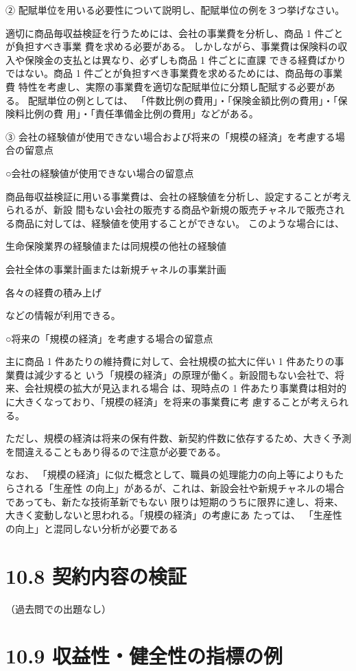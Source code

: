 \documentclass[report,gutter=10mm,fore-edge=10mm,uplatex,dvipdfmx]{jlreq}
\begin{document}
② 配賦単位を用いる必要性について説明し、配賦単位の例を３つ挙げなさい。

適切に商品毎収益検証を行うためには、会社の事業費を分析し、商品 1 件ごとが負担すべき事業
費を求める必要がある。
しかしながら、事業費は保険料の収入や保険金の支払とは異なり、必ずしも商品 1 件ごとに直課
できる経費ばかりではない。商品 1 件ごとが負担すべき事業費を求めるためには、商品毎の事業費
特性を考慮し、実際の事業費を適切な配賦単位に分類し配賦する必要がある。
配賦単位の例としては、
「件数比例の費用」・「保険金額比例の費用」・「保険料比例の費
用」・「責任準備金比例の費用」などがある。

③ 会社の経験値が使用できない場合および将来の「規模の経済」を考慮する場合の留意点

○会社の経験値が使用できない場合の留意点

商品毎収益検証に用いる事業費は、会社の経験値を分析し、設定することが考えられるが、新設
間もない会社の販売する商品や新規の販売チャネルで販売される商品に対しては、経験値を使用することができない。
このような場合には、

生命保険業界の経験値または同規模の他社の経験値

会社全体の事業計画または新規チャネルの事業計画

各々の経費の積み上げ

などの情報が利用できる。

○将来の「規模の経済」を考慮する場合の留意点

主に商品 1 件あたりの維持費に対して、会社規模の拡大に伴い 1 件あたりの事業費は減少すると
いう「規模の経済」の原理が働く。新設間もない会社で、将来、会社規模の拡大が見込まれる場合
は、現時点の 1 件あたり事業費は相対的に大きくなっており、「規模の経済」を将来の事業費に考
慮することが考えられる。

ただし、規模の経済は将来の保有件数、新契約件数に依存するため、大きく予測を間違えることもあり得るので注意が必要である。

なお、
「規模の経済」に似た概念として、職員の処理能力の向上等によりもたらされる「生産性
の向上」があるが、これは、新設会社や新規チャネルの場合であっても、新たな技術革新でもない
限りは短期のうちに限界に達し、将来、大きく変動しないと思われる。「規模の経済」の考慮にあ
たっては、
「生産性の向上」と混同しない分析が必要である


\section{10.8 契約内容の検証}
（過去問での出題なし）
\section{10.9 収益性・健全性の指標の例}
\end{document}
